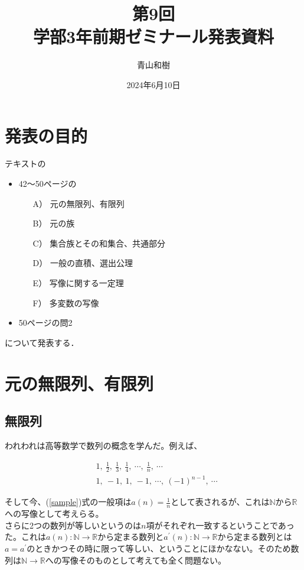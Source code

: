 \documentclass[a4j]{jsarticle}
\title{第9回\\学部3年前期ゼミナール発表資料}
\author{青山和樹}
\date{2024年6月10日}
\begin{document}
\maketitle

\section*{発表の目的}
テキスト\cite{text}の
\begin{itemize}
	\item 42～50ページの
	      \begin{itemize}
		      \item[A）] 元の無限列、有限列
		      \item[B）] 元の族
		      \item[C）] 集合族とその和集合、共通部分
		      \item[D）] 一般の直積、選出公理
		      \item[E）] 写像に関する一定理
		      \item[F）] 多変数の写像
	      \end{itemize}
	\item 50ページの問2
\end{itemize}
について発表する．

\tableofcontents

\clearpage

\section{元の無限列、有限列}

\subsection{無限列}

われわれは高等数学で数列の概念を学んだ。例えば、

\begin{align}
	\label{sample}
	 & 1,\:\frac{1}{2},\:\frac{1}{3},\:\frac{1}{4},\:\cdots,\:\frac{1}{n},\:\cdots \\
	 & 1,\:-1,\:1,\:-1,\:\cdots,\:(-1)^{n-1},\:\cdots
\end{align}

そして今、(\ref{sample})式の一般項は$a(n)=\frac{1}{n}$として表されるが、これは$\mathbb{N}$から$\mathbb{R}$への写像として考えらる。\\
さらに2つの数列が等しいというのは$n$項がそれぞれ一致するということであった。これは$a(n) : \mathbb{N} \rightarrow \mathbb{R}$から定まる数列と$a^{\prime}(n) : \mathbb{N} \rightarrow \mathbb{R}$から定まる数列とは$a=a^{\prime}$のときかつその時に限って等しい、ということにほかなない。そのため数列は$\mathbb{N} \rightarrow \mathbb{R}$への写像そのものとして考えても全く問題ない。\\
\end{document}
